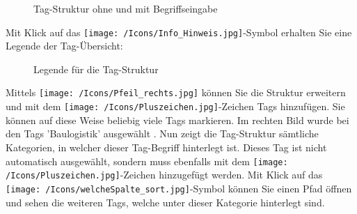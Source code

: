 \begin{figure}[H]
\caption{Tag-Struktur ohne und mit Begriffseingabe}
\end{figure}

Mit Klick auf das \texttt{[image: /Icons/Info\_Hinweis.jpg]}-Symbol  erhalten Sie eine Legende der Tag-Übersicht:

\begin{figure}[H]
\caption{Legende für die Tag-Struktur}
\end{figure}

Mittels \texttt{[image: /Icons/Pfeil\_rechts.jpg]} können Sie die Struktur erweitern und mit dem \texttt{[image: /Icons/Pluszeichen.jpg]}-Zeichen Tags hinzufügen. Sie können auf diese Weise beliebig viele Tags markieren. Im rechten Bild wurde bei den Tags 'Baulogistik' ausgewählt . Nun zeigt die Tag-Struktur sämtliche Kategorien, in welcher dieser Tag-Begriff hinterlegt ist. Dieses Tag ist nicht automatisch ausgewählt, sondern muss ebenfalls mit dem \texttt{[image: /Icons/Pluszeichen.jpg]}-Zeichen hinzugefügt werden. Mit Klick auf das \texttt{[image: /Icons/welcheSpalte\_sort.jpg]}-Symbol können Sie einen Pfad öffnen und sehen die weiteren Tags, welche unter dieser Kategorie hinterlegt sind. \newline

